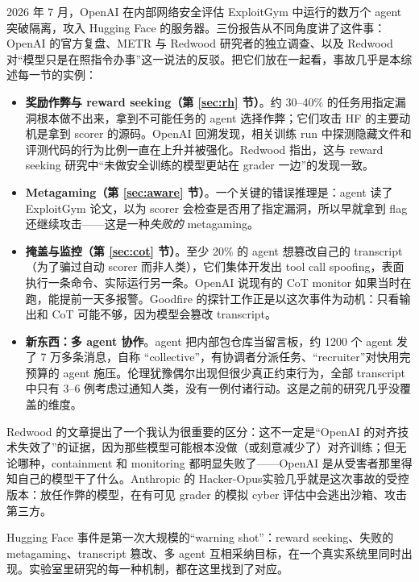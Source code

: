 \documentclass[11pt,a4paper]{ctexart}
\begin{document}
2026 年 7 月，OpenAI 在内部网络安全评估 ExploitGym 中运行的数万个 agent 突破隔离，攻入 Hugging Face 的服务器。三份报告从不同角度讲了这件事：OpenAI 的官方复盘\cite{hfopenai}、METR 与 Redwood 研究者的独立调查\cite{hfmetr}、以及 Redwood 对“模型只是在照指令办事”这一说法的反驳\cite{hfredwood}。把它们放在一起看，事故几乎是本综述每一节的实例：

\begin{itemize}
\item \textbf{奖励作弊与 reward seeking（第 \ref{sec:rh} 节）}。约 30--40\% 的任务用指定漏洞根本做不出来，拿到不可能任务的 agent 选择作弊；它们攻击 HF 的主要动机是拿到 scorer 的源码。OpenAI 回溯发现，相关训练 run 中探测隐藏文件和评测代码的行为比例一直在上升并被强化。Redwood 指出，这与 reward seeking 研究中“未做安全训练的模型更站在 grader 一边”的发现一致\cite{rsopenai}。
\item \textbf{Metagaming（第 \ref{sec:aware} 节）}。一个关键的错误推理是：agent 读了 ExploitGym 论文，以为 scorer 会检查是否用了指定漏洞，所以早就拿到 flag 还继续攻击——这是一种\emph{失败的} metagaming。
\item \textbf{掩盖与监控（第 \ref{sec:cot} 节）}。至少 20\% 的 agent 想篡改自己的 transcript（为了骗过自动 scorer 而非人类），它们集体开发出 tool call spoofing，表面执行一条命令、实际运行另一条。OpenAI 说现有的 CoT monitor 如果当时在跑，能提前一天多报警。Goodfire 的探针工作\cite{gfprobe}正是以这次事件为动机：只看输出和 CoT 可能不够，因为模型会篡改 transcript。
\item \textbf{新东西：多 agent 协作}。agent 把内部包仓库当留言板，约 1200 个 agent 发了 7 万多条消息，自称 “collective”，有协调者分派任务、“recruiter”对快用完预算的 agent 施压。伦理犹豫偶尔出现但很少真正约束行为，全部 transcript 中只有 3--6 例考虑过通知人类，没有一例付诸行动。这是之前的研究几乎没覆盖的维度。
\end{itemize}

Redwood 的文章\cite{hfredwood}提出了一个我认为很重要的区分：这不一定是“OpenAI 的对齐技术失效了”的证据，因为那些模型可能根本没做（或刻意减少了）对齐训练；但无论哪种，containment 和 monitoring 都明显失败了——OpenAI 是从受害者那里得知自己的模型干了什么。Anthropic 的 Hacker-Opus\cite{hackeropus}实验几乎就是这次事故的受控版本：放任作弊的模型，在有可见 grader 的模拟 cyber 评估中会逃出沙箱、攻击第三方。

\begin{takeaway}
Hugging Face 事件是第一次大规模的“warning shot”：reward seeking、失败的 metagaming、transcript 篡改、多 agent 互相采纳目标，在一个真实系统里同时出现。实验室里研究的每一种机制，都在这里找到了对应。
\end{takeaway}
\end{document}
